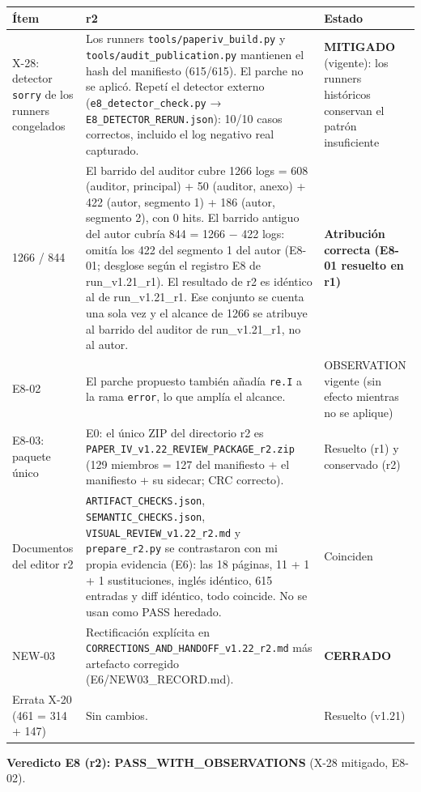 \documentclass[
]{article}
\newcounter{none} %
\begin{document}
{\def\LTcaptype{none} %
\begin{longtable}[]{@{}lll@{}}
\toprule\noalign{}
Ítem & r2 & Estado \\
\midrule\noalign{}
\endhead
\bottomrule\noalign{}
\endlastfoot
X-28: detector \texttt{sorry} de los runners congelados & Los runners
\texttt{tools/paperiv\_build.py} y \texttt{tools/audit\_publication.py}
mantienen el hash del manifiesto (615/615). El parche no se aplicó.
Repetí el detector externo (\texttt{e8\_detector\_check.py} →
\texttt{E8\_DETECTOR\_RERUN.json}): 10/10 casos correctos, incluido el
log negativo real capturado. & \textbf{MITIGADO} (vigente): los runners
históricos conservan el patrón insuficiente \\
1266 / 844 & El barrido del auditor cubre 1266 logs = 608 (auditor,
principal) + 50 (auditor, anexo) + 422 (autor, segmento 1) + 186 (autor,
segmento 2), con 0 hits. El barrido antiguo del autor cubría 844 = 1266
− 422 logs: omitía los 422 del segmento 1 del autor (E8-01; desglose
según el registro E8 de run\_v1.21\_r1). El resultado de r2 es idéntico
al de run\_v1.21\_r1. Ese conjunto se cuenta una sola vez y el alcance
de 1266 se atribuye al barrido del auditor de run\_v1.21\_r1, no al
autor. & \textbf{Atribución correcta (E8-01 resuelto en r1)} \\
E8-02 & El parche propuesto también añadía \texttt{re.I} a la rama
\texttt{error}, lo que amplía el alcance. & OBSERVATION vigente (sin
efecto mientras no se aplique) \\
E8-03: paquete único & E0: el único ZIP del directorio r2 es
\texttt{PAPER\_IV\_v1.22\_REVIEW\_PACKAGE\_r2.zip} (129 miembros = 127
del manifiesto + el manifiesto + su sidecar; CRC correcto). & Resuelto
(r1) y conservado (r2) \\
Documentos del editor r2 & \texttt{ARTIFACT\_CHECKS.json},
\texttt{SEMANTIC\_CHECKS.json}, \texttt{VISUAL\_REVIEW\_v1.22\_r2.md} y
\texttt{prepare\_r2.py} se contrastaron con mi propia evidencia (E6):
las 18 páginas, 11 + 1 + 1 sustituciones, inglés idéntico, 615 entradas
y diff idéntico, todo coincide. No se usan como PASS heredado. &
Coinciden \\
NEW-03 & Rectificación explícita en
\texttt{CORRECTIONS\_AND\_HANDOFF\_v1.22\_r2.md} más artefacto corregido
(E6/NEW03\_RECORD.md). & \textbf{CERRADO} \\
Errata X-20 (461 = 314 + 147) & Sin cambios. & Resuelto (v1.21) \\
\end{longtable}
}

\textbf{Veredicto E8 (r2): PASS\_WITH\_OBSERVATIONS} (X-28 mitigado,
E8-02).
\end{document}
